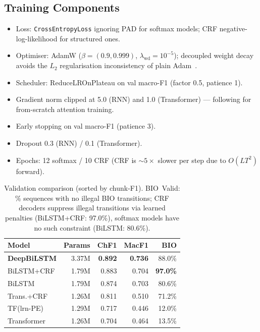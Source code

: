 \documentclass[10pt,a4paper,twocolumn]{article}
\begin{document}
\subsection*{Training Components}
\begin{itemize}
    \item Loss: \texttt{CrossEntropyLoss} ignoring PAD for softmax models; CRF
    negative-log-likelihood for structured ones. 
    
    \item Optimiser: AdamW
    ($\beta\!=\!(0.9,0.999)$, $\lambda_{\text{wd}}\!=\!10^{-5}$); decoupled
    weight decay avoids the $L_2$ regularisation inconsistency of plain
    Adam~\citep{Loshchilov2019}. 
    
    \item Scheduler: ReduceLROnPlateau on val macro-F1
    (factor 0.5, patience 1). 
    
    \item Gradient norm clipped at 5.0 (RNN) and 1.0 (Transformer) — following \citet{Vaswani2017} for from-scratch attention training.
    
    \item Early stopping on val macro-F1 (patience 3). 
    
    \item Dropout 0.3 (RNN) / 0.1 (Transformer). 
    
    \item Epochs: 12 softmax / 10 CRF (CRF is $\sim5{\times}$ slower
    per step due to $O(LT^2)$ forward).
\end{itemize}

\begin{table}[t]\centering\footnotesize
\caption{Validation comparison (sorted by chunk-F1).
BIO~Valid: \% sequences with no illegal BIO transitions;
CRF decoders suppress illegal transitions via learned penalties
(BiLSTM+CRF: 97.0\%), softmax models have no such constraint (BiLSTM: 80.6\%).}
\label{tab:val}
\setlength{\tabcolsep}{3pt}
\begin{tabular}{@{}lrrrr@{}}
\toprule
Model & Params & ChF1 & MacF1 & BIO \\
\midrule
\textbf{DeepBiLSTM} & 3.37M & \textbf{0.892} & \textbf{0.736} & 88.0\% \\
BiLSTM+CRF  & 1.79M & 0.883 & 0.704 & \textbf{97.0\%} \\
BiLSTM      & 1.79M & 0.874 & 0.703 & 80.6\% \\
Trans.+CRF  & 1.26M & 0.811 & 0.510 & 71.2\% \\
TF(lrn-PE)  & 1.29M & 0.717 & 0.446 & 12.0\% \\
Transformer & 1.26M & 0.704 & 0.464 & 13.5\% \\
\bottomrule
\end{tabular}
\end{table}
\end{document}
